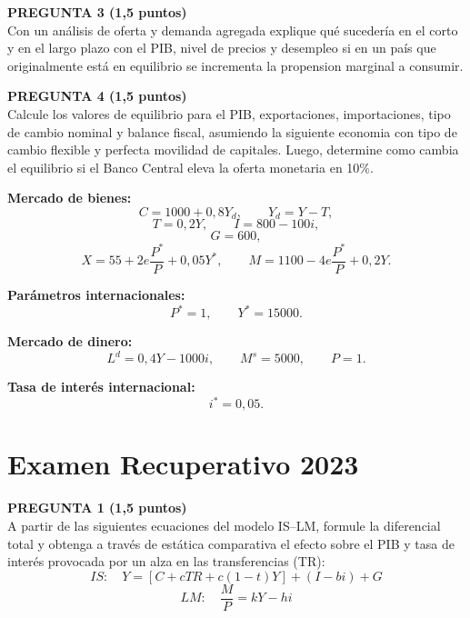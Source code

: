 \documentclass[11pt,addpoints]{article}
\begin{document}
\vspace{0.4cm}

\textbf{PREGUNTA 3 (1,5 puntos)}\\[0.2cm]
Con un análisis de oferta y demanda agregada explique qué sucedería en el corto y en el largo plazo con el PIB, nivel de precios y desempleo si en un país que originalmente está en equilibrio se incrementa la propension marginal a consumir. 

\vspace{0.4cm}

\textbf{PREGUNTA 4 (1,5 puntos)}\\[0.2cm]
Calcule los valores de equilibrio para el PIB, exportaciones, importaciones, tipo de cambio nominal y balance fiscal, asumiendo la siguiente economia con tipo de cambio flexible y perfecta movilidad de capitales. Luego, determine como cambia el equilibrio si el Banco Central eleva la oferta monetaria en 10\%.

\medskip
\textbf{Mercado de bienes:}
\[
C = 1000 + 0{,}8Y_d, \qquad Y_d = Y - T,
\]
\[
T = 0{,}2Y, \qquad I = 800 - 100i,
\]
\[
G = 600,
\]
\[
X = 55 + 2e\frac{P^*}{P} + 0{,}05Y^*, \qquad
M = 1100 - 4e\frac{P^*}{P} + 0{,}2Y.
\]

\textbf{Parámetros internacionales:}
\[
P^* = 1, \qquad Y^* = 15000.
\]

\textbf{Mercado de dinero:}
\[
L^d = 0{,}4Y - 1000i, \qquad M^s = 5000, \qquad P = 1.
\]

\textbf{Tasa de interés internacional:}
\[
i^* = 0{,}05.
\]


\newpage
\vspace*{0.1cm}
\section*{Examen Recuperativo 2023}

\vspace{0.4cm}

\textbf{PREGUNTA 1 (1,5 puntos)}\\[0.2cm]
A partir de las siguientes ecuaciones del modelo IS--LM, formule la diferencial total y obtenga a través de estática comparativa el efecto sobre el PIB y tasa de interés provocada por un alza en las transferencias (TR):
\[
IS: \quad Y = [C + cTR + c(1 - t)Y] + (I - bi) + G
\]
\[
LM: \quad \frac{M}{P} = kY - hi
\]


\vspace{0.4cm}
\end{document}

